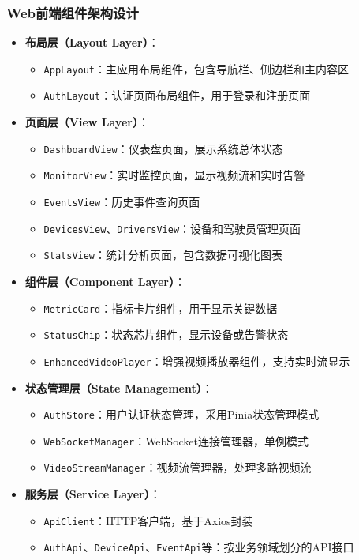 \documentclass[a4paper,12pt]{article}
\begin{document}
\subsubsection{Web前端组件架构设计}
\begin{itemize}
  \item \textbf{布局层（Layout Layer）}：
    \begin{itemize}
      \item \texttt{AppLayout}：主应用布局组件，包含导航栏、侧边栏和主内容区
      \item \texttt{AuthLayout}：认证页面布局组件，用于登录和注册页面
    \end{itemize}
  \item \textbf{页面层（View Layer）}：
    \begin{itemize}
      \item \texttt{DashboardView}：仪表盘页面，展示系统总体状态
      \item \texttt{MonitorView}：实时监控页面，显示视频流和实时告警
      \item \texttt{EventsView}：历史事件查询页面
      \item \texttt{DevicesView}、\texttt{DriversView}：设备和驾驶员管理页面
      \item \texttt{StatsView}：统计分析页面，包含数据可视化图表
    \end{itemize}
  \item \textbf{组件层（Component Layer）}：
    \begin{itemize}
      \item \texttt{MetricCard}：指标卡片组件，用于显示关键数据
      \item \texttt{StatusChip}：状态芯片组件，显示设备或告警状态
      \item \texttt{EnhancedVideoPlayer}：增强视频播放器组件，支持实时流显示
    \end{itemize}
  \item \textbf{状态管理层（State Management）}：
    \begin{itemize}
      \item \texttt{AuthStore}：用户认证状态管理，采用Pinia状态管理模式
      \item \texttt{WebSocketManager}：WebSocket连接管理器，单例模式
      \item \texttt{VideoStreamManager}：视频流管理器，处理多路视频流
    \end{itemize}
  \item \textbf{服务层（Service Layer）}：
    \begin{itemize}
      \item \texttt{ApiClient}：HTTP客户端，基于Axios封装
      \item \texttt{AuthApi}、\texttt{DeviceApi}、\texttt{EventApi}等：按业务领域划分的API接口
    \end{itemize}
\end{itemize}
\end{document}
